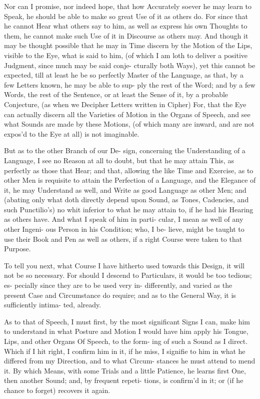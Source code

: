 Nor can I promise, nor indeed hope,
that how Accurately soever he may learn
to Speak, he should be able to make so
great Use of it as others do. For since
that he cannot Hear what others say to
him, as well as express his own Thoughts
to them, he cannot make such Use of it
in Discourse as others may. And though
it may be thought possible that he may in
Time discern by the Motion of the Lips,
visible to the Eye, what is said to him,
(of which I am loth to deliver a positive
Judgment, since much may be said conje-
cturally both Ways), yet this cannot be
expected, till at least he be so perfectly
Master of the Language, as that, by a
few Letters known, he may be able to sup-
ply the rest of the Word; and by a few
Words, the rest of the Sentence, or at least
the Sense of it, by a probable Conjecture,
(as when we Decipher Letters written in
Cipher) For, that the Eye can actually
discern all the Varieties of Motion in the
Organs of Speech, and see what Sounds
are made by these Motions, (of which
many are inward, and are not expos'd to
the Eye at all) is not imaginable.

But as to the other Branch of our De-
sign, concerning the Understanding of a
Language, I see no Reason at all to doubt,
but that he may attain This, as perfectly as
those that Hear; and that, allowing the
like Time and Exercise, as to other Men
is requisite to attain the Perfection of a
Language, and the Elegance of it, he may
Understand as well, and Write as good
Language as other Men; and (abating
only what doth directly depend upon
Sound, as Tones, Cadencies, and such
Punctilio's) no whit inferior to what he may
attain to, if he had his Hearing as others
have. And what I speak of him in parti-
cular, I mean as well of any other Ingeni-
ous Person in his Condition; who, I be-
lieve, might be taught to use their Book
and Pen as well as others, if a right Course
were taken to that Purpose.

To tell you next, what Course I have
hitherto used towards this Design, it will
not be so necessary. For should I descend to
Particulars, it would be too tedious; es-
pecially since they are to be used very in-
differently, and varied as the present Case
and Circumstance do require; and as to
the General Way, it is sufficiently intima-
ted, already.

As to that of Speech, I must first, by
the most significant Signs I can, make him
to understand in what Posture and Motion
I would have him apply his Tongue, Lips,
and other Organs Of Speech, to the form-
ing of such a Sound as I direct. Which
if I hit right, I confirm him in it, if he
miss, I signifie to him in what he differed
from my Direction, and to what Circum-
stances he must attend to mend it. By
which Means, with some Trials and a
little Patience, he learns first One, then
another Sound; and, by frequent repeti-
tions, is confirm'd in it; or (if he chance
to forget) recovers it again.

